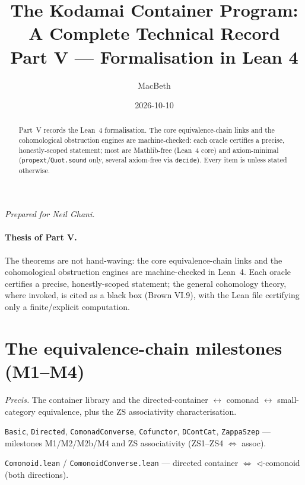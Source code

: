 \documentclass[11pt]{article}
\title{The Kodamai Container Program: A Complete Technical Record\\[4pt]
\large Part V --- Formalisation in Lean 4}
\author{MacBeth}
\date{2026-10-10}
\begin{document}
\maketitle
\begin{center}\itshape Prepared for Neil Ghani.\end{center}

\begin{abstract}
Part~V records the Lean~4 formalisation. The core equivalence-chain links and the cohomological
obstruction engines are machine-checked: each oracle certifies a precise, honestly-scoped
statement; most are Mathlib-free (Lean~4 core) and axiom-minimal (\texttt{propext}/\texttt{Quot.sound}
only, several axiom-free via \texttt{decide}). Every item is  unless stated
otherwise.
\end{abstract}

\paragraph{Thesis of Part V.}
The theorems are not hand-waving: the core equivalence-chain links and the cohomological obstruction
engines are machine-checked in Lean~4. Each oracle certifies a precise, honestly-scoped statement;
the general cohomology theory, where invoked, is cited as a black box (Brown VI.9), with the Lean
file certifying only a finite/explicit computation.

\section{The equivalence-chain milestones (M1--M4)}
\emph{Precis.} The container library and the directed-container $\leftrightarrow$ comonad
$\leftrightarrow$ small-category equivalence, plus the ZS associativity characterisation.

\begin{theorem}
\texttt{Basic}, \texttt{Directed}, \texttt{ComonadConverse}, \texttt{Cofunctor}, \texttt{DContCat},
\texttt{ZappaSzep} --- milestones M1/M2/M2b/M4 and ZS associativity (ZS1--ZS4 $\iff$ assoc).
\end{theorem}

\begin{theorem}
\texttt{Comonoid.lean} / \texttt{ComonoidConverse.lean} --- directed container $\iff$
$\triangleleft$-comonoid (both directions).
\end{theorem}
\end{document}
